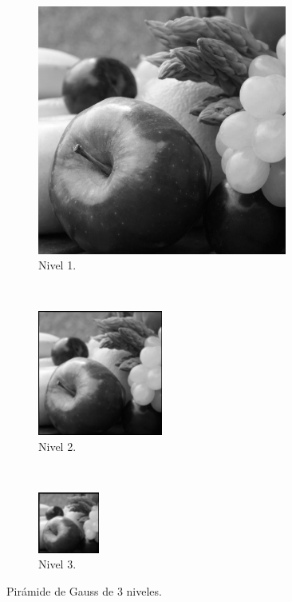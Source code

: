 \begin{figure}[H]
  \centering
  \begin{subfigure}[t]{0.32\textwidth}
    \centering
    \includegraphics[width = 0.9\textwidth]{piramides/gp1.png}
    \caption{Nivel 1.}
  \end{subfigure}
  ~
  \begin{subfigure}[t]{0.32\textwidth}
      \centering
      \includegraphics[width = 0.45\textwidth]{piramides/gp2.png}
      \caption{Nivel 2.}
  \end{subfigure}
  ~ 
  \begin{subfigure}[t]{0.32\textwidth}
      \centering
      \includegraphics[width = 0.22\textwidth]{piramides/gp3.png}
      \caption{Nivel 3.}
  \end{subfigure}
  \caption{Pirámide de Gauss de 3 niveles.}
  \label{fig:gp3frutas}
\end{figure}

